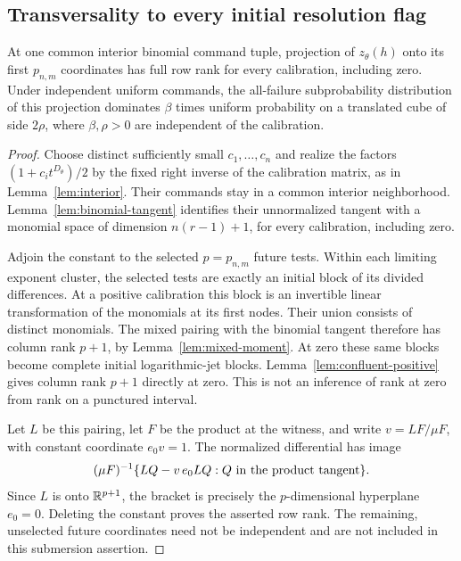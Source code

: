 \subsection{Transversality to every initial resolution flag}
\begin{lemma}\label{lem:attained-flag}
At one common interior binomial command tuple, projection of
$z_\theta(h)$ onto its first $p_{n,m}$ coordinates has full row rank
for every calibration, including zero. Under independent uniform commands,
the all-failure subprobability distribution of this projection dominates
$\beta$ times uniform probability on a translated cube of side $2\rho$,
where $\beta,\rho>0$ are independent of the calibration.
\end{lemma}
\begin{proof}
Choose distinct sufficiently small $c_1,\ldots,c_n$ and realize the
factors $(1+c_it^{D_\theta})/2$ by the fixed right inverse of the
calibration matrix, as in Lemma~\ref{lem:interior}. Their commands stay
in a common interior neighborhood. Lemma~\ref{lem:binomial-tangent}
identifies their unnormalized tangent with a monomial space of dimension
$n(r-1)+1$, for every calibration, including zero.

Adjoin the constant to the selected $p=p_{n,m}$ future tests. Within
each limiting exponent cluster, the selected tests are exactly an initial
block of its divided differences. At a positive calibration this block
is an invertible linear transformation of the monomials at its first
nodes. Their union consists of distinct monomials. The mixed pairing
with the binomial tangent therefore has column rank $p+1$, by
Lemma~\ref{lem:mixed-moment}. At zero these same blocks become complete
initial logarithmic-jet blocks. Lemma~\ref{lem:confluent-positive}
gives column rank $p+1$ directly at zero. This is not an inference of
rank at zero from rank on a punctured interval.

Let $L$ be this pairing, let $F$ be the product at the witness, and
write $v=LF/\mu F$, with constant coordinate $e_0v=1$.
The normalized differential has image
\[
 (\mu F)^{-1}\{LQ-v\,e_0LQ:Q\hbox{ in the product tangent}\}.
\]
Since $L$ is onto $\mathbb R^{p+1}$, the bracket is precisely the
$p$-dimensional hyperplane $e_0=0$. Deleting the constant proves the
asserted row rank. The remaining, unselected future coordinates need not
be independent and are not included in this submersion assertion.


\end{proof}
